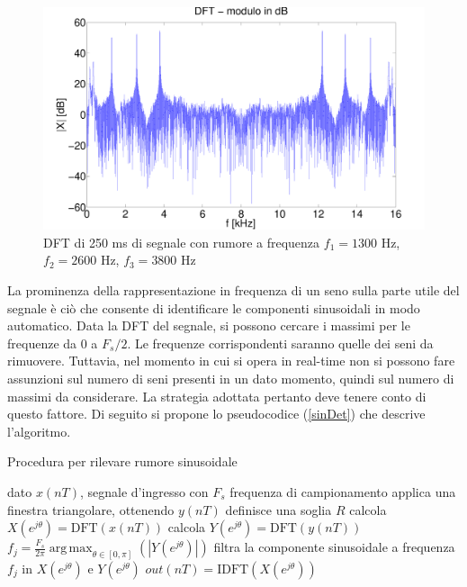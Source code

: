 \documentclass[10pt,A4]{article}
\DeclareMathOperator*{\argmax}{arg\,max}
\begin{document}
\begin{figure}[h]
  \centering
  \includegraphics[width = 1\textwidth, keepaspectratio]{images/DFTdB.pdf}
  \caption{DFT di 250 ms di segnale con rumore a frequenza $f_1 = 1300$ Hz, $f_2 = 2600$ Hz, $f_3 = 3800$ Hz}
  \label{fig:unfilt}
\end{figure}

La prominenza della rappresentazione in frequenza di un seno sulla parte utile del segnale è ciò che consente di identificare le componenti sinusoidali in modo automatico. Data la DFT del segnale, si possono cercare i massimi per le frequenze da 0 a $F_s/2$. Le frequenze corrispondenti saranno quelle dei seni da rimuovere. Tuttavia, nel momento in cui si opera in real-time non si possono fare assunzioni sul numero di seni presenti in un dato momento, quindi sul numero di massimi da considerare. La strategia adottata pertanto deve tenere conto di questo fattore. Di seguito si propone lo pseudocodice (\ref{sinDet}) che descrive l'algoritmo. \\
\newpage

\begin{algorithm}
  \caption{Procedura per rilevare rumore sinusoidale}\label{sinDet}
  \begin{algorithmic}[1]
    \Procedure{}{}
    \State dato $x(nT)$, segnale d'ingresso con
    \State $F_s$ frequenza di campionamento
    \State applica una finestra triangolare, ottenendo $y(nT)$
    \State definisce una soglia $R$
    \State calcola $X(e^{j\theta}) = \mathrm{DFT}(x(nT))$
    \State calcola $Y(e^{j\theta}) = \mathrm{DFT}(y(nT))$
    \State $f_j = \frac{F_s}{2\pi} \argmax_{\theta \in [0, \pi]}(|Y(e^{j\theta})|)$
    \State filtra la componente sinusoidale a frequenza $f_j$ in $X(e^{j\theta})$ e $Y(e^{j\theta})$
    \EndWhile
    \State $out(nT) = \mathrm{IDFT}(X(e^{j\theta}))$
    \EndProcedure
  \end{algorithmic}
\end{algorithm}
\end{document}
